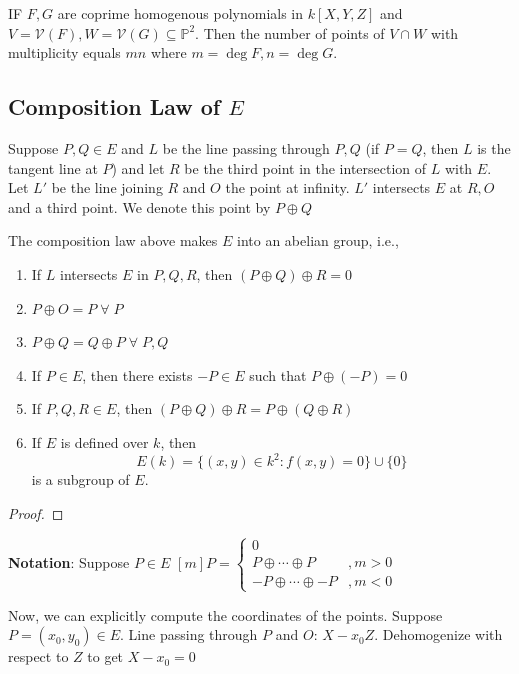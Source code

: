 \documentclass[oneside, 12pt, ]{scrbook}
\newcommand{\V}{\mathcal{V}}
\newcommand{\PP}{\mathbb{P}}
\theoremstyle{theorem}
\begin{document}
\begin{theorem}
IF $F,G$ are coprime homogenous polynomials in $k[X,Y,Z]$ and $V=\V(F), W=\V(G) \subseteq \PP^2$. Then the number of points of $V\cap W$ with multiplicity equals $mn$ where $m=\deg F, n = \deg G$.
\end{theorem}

\subsection{Composition Law of $E$}
Suppose $P,Q \in E$ and $L$ be the line passing through $P,Q$ (if $P=Q$, then $L$ is the tangent line at $P$) and let $R$ be the third point in the intersection of $L$ with $E$. Let $L'$ be the line joining $R$ and $O$ the point at infinity. $L'$ intersects $E$ at $R,O$ and a third point. We denote this point by $P \oplus Q$

\begin{proposition}
The composition law above makes $E$ into an abelian group, i.e., 
\begin{enumerate}
\item If $L$ intersects $E$ in $P,Q,R$, then $(P \oplus Q) \oplus R = 0$
\item $P \oplus O = P \; \forall \; P$
\item $P \oplus Q = Q \oplus P \; \forall \; P,Q$
\item If $P \in E$, then there exists $-P \in E$ such that $P \oplus (-P) = 0$
\item If $P,Q,R \in E$, then $(P \oplus Q ) \oplus R = P \oplus (Q \oplus R)$
\item If $E$ is defined over $k$, then $$E(k) = \{(x,y) \in k^2 : f(x,y)=0\} \cup \{0\}$$ is a subgroup of $E$.
\end{enumerate}
\end{proposition} 

\begin{proof}

\end{proof}

\textbf{Notation}: Suppose $P \in E$
$ [m]P = \begin{cases}
0 & \\
P \oplus \cdots \oplus P &, m>0 \\
-P \oplus \cdots \oplus -P &, m<0
\end{cases} $

Now, we can explicitly compute the coordinates of the points. Suppose $P = (x_{0},y_{0}) \in E$. Line passing through $P$ and $O$: $X-x_{0}Z$. Dehomogenize with respect to $Z$ to get $X-x_{0}=0$
\end{document}
